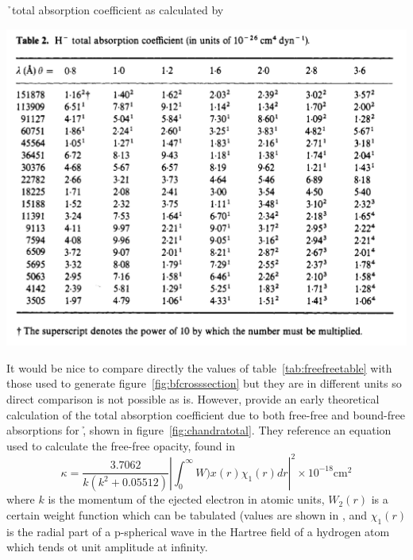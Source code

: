\begin{table}
\caption{\label{tab:boundfreecomp}\h\ total absorption coefficient as calculated by \cite{bell1975}}
\includegraphics[width=\linewidth]{figs/freeandboundtable.png}
\end{table}

It would be nice to compare directly the values of
table~\ref{tab:freefreetable} with those used to generate
figure~\ref{fig:bfcrosssection} but they are in different units so
direct comparison is not possible as is.  However, \cite{chandra1946}
provide an early theoretical calculation of the total absorption
coefficient due to both free-free and bound-free absorptions for \h,
shown in figure~\ref{fig:chandratotal}.  They reference an equation
used to calculate the free-free opacity, found in \cite{chandra1945}
\begin{equation}
\kappa = \frac{3.7062}{k(k^2+0.05512)}\left\lvert \int_0^{\infty}W)x(r)\chi_1(r)dr \right\rvert^2 \times 10^{-18} \textrm{cm}^2
\end{equation}
where $k$ is the momentum of the ejected electron in atomic units, $W_2(r)$ is a certain weight function which can be tabulated (values are shown in \citealt{chandra1945}, and $\chi_1(r)$ is the radial part of a p-spherical wave in the Hartree field of a hydrogen atom which tends ot unit amplitude at infinity.

